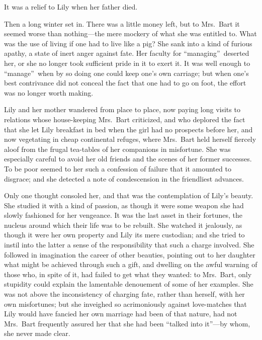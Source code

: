 \documentclass[12pt,a4paper]{book}
\begin{document}
It was a relief to Lily when her father died.





Then a long winter set in. There was a little money left, but to
Mrs.\ Bart it seemed worse than nothing---the mere mockery of what
she was entitled to. What was the use of living if one had to
live like a pig? She sank into a kind of furious apathy, a state
of inert anger against fate. Her faculty for ``managing''\ deserted
her, or she no longer took sufficient pride in it to exert it. It
was well enough to ``manage''\ when by so doing one could keep one's
own carriage; but when one's best contrivance did not conceal the
fact that one had to go on foot, the effort was no longer worth
making.





Lily and her mother wandered from place to place, now paying long
visits to relations whose house-keeping Mrs.\ Bart criticized, and
who deplored the fact that she let Lily breakfast in bed when the
girl had no prospects before her, and now vegetating in cheap
continental refuges, where Mrs.\ Bart held herself fiercely aloof
from the frugal tea-tables of her companions in misfortune. She
was especially careful to avoid her old friends and the scenes of
her former successes. To be poor seemed to her such a confession
of failure that it amounted to disgrace; and she detected a note
of condescension in the friendliest advances.





Only one thought consoled her, and that was the contemplation of
Lily's beauty. She studied it with a kind of passion, as though
it were some weapon she had slowly fashioned for her vengeance. 
It was the last asset in their fortunes, the nucleus around which
their life was to be rebuilt. She watched it jealously, as though
it were her own property and Lily its mere custodian; and she
tried to instil into the latter a sense of the responsibility
that such a charge involved. She followed in imagination the
career of other beauties, pointing out to her daughter what might
be achieved through such a gift, and dwelling on the awful
warning of those who, in spite of it, had failed to get what they
wanted: to Mrs.\ Bart, only stupidity could explain the lamentable
denouement of some of her examples. She was not above the
inconsistency of charging fate, rather than herself, with her own
misfortunes; but she inveighed so acrimoniously against
love-matches that Lily would have fancied her own marriage had
been of that nature, had not Mrs.\ Bart frequently assured her
that she had been ``talked into it''---by whom, she never made
clear.
\end{document}

